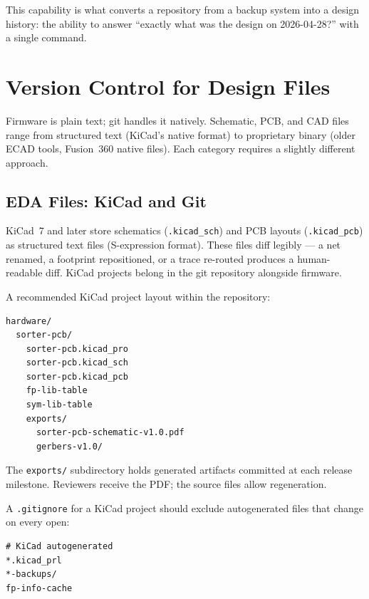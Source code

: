 \noindent This capability is what converts a repository from a backup system into a design
history: the ability to answer ``exactly what was the design on 2026-04-28?'' with a
single command.

\section{Version Control for Design Files}
\label{sec:ch13-design-files}

Firmware is plain text; git handles it natively.
Schematic, PCB, and CAD files range from structured text (KiCad's native format) to
proprietary binary (older ECAD tools, Fusion~360 native files).
Each category requires a slightly different approach.

\subsection{EDA Files: KiCad and Git}
\label{subsec:ch13-kicad}

KiCad~7 and later store schematics
(\texttt{.kicad\_sch}) and PCB layouts (\texttt{.kicad\_pcb}) as structured text files
(S-expression format).
These files diff legibly --- a net renamed, a footprint repositioned, or a trace re-routed
produces a human-readable diff.
KiCad projects belong in the git repository alongside firmware.

A recommended KiCad project layout within the repository:

\begin{verbatim}
hardware/
  sorter-pcb/
    sorter-pcb.kicad_pro
    sorter-pcb.kicad_sch
    sorter-pcb.kicad_pcb
    fp-lib-table
    sym-lib-table
    exports/
      sorter-pcb-schematic-v1.0.pdf
      gerbers-v1.0/
\end{verbatim}

The \texttt{exports/} subdirectory holds generated artifacts committed at each release
milestone.
Reviewers receive the PDF; the source files allow regeneration.

A \texttt{.gitignore} for a KiCad project should exclude autogenerated files that change
on every open:

\begin{verbatim}
# KiCad autogenerated
*.kicad_prl
*-backups/
fp-info-cache
\end{verbatim}


